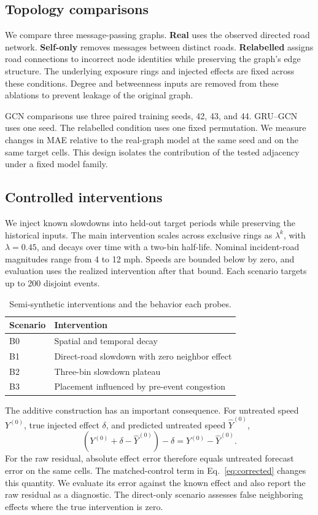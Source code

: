 \documentclass[sigconf,nonacm]{acmart}
\begin{document}
\subsection{Topology comparisons}
We compare three message-passing graphs. \textbf{Real} uses the observed directed road network. \textbf{Self-only} removes messages between distinct roads. \textbf{Relabelled} assigns road connections to incorrect node identities while preserving the graph's edge structure. The underlying exposure rings and injected effects are fixed across these conditions. Degree and betweenness inputs are removed from these ablations to prevent leakage of the original graph.

GCN comparisons use three paired training seeds, 42, 43, and 44. GRU--GCN uses one seed. The relabelled condition uses one fixed permutation. We measure changes in MAE relative to the real-graph model at the same seed and on the same target cells. This design isolates the contribution of the tested adjacency under a fixed model family.

\subsection{Controlled interventions}
We inject known slowdowns into held-out target periods while preserving the historical inputs. The main intervention scales across exclusive rings as $\lambda^k$, with $\lambda=0.45$, and decays over time with a two-bin half-life. Nominal incident-road magnitudes range from 4 to 12 mph. Speeds are bounded below by zero, and evaluation uses the realized intervention after that bound. Each scenario targets up to 200 disjoint events.

\begin{table}[t]
\centering
\caption{Semi-synthetic interventions and the behavior each probes.}
\label{tab:scenarios}
\footnotesize
\begin{tabular}{lp{}}
\toprule
Scenario & Intervention \\
\midrule
B0 & Spatial and temporal decay \\
B1 & Direct-road slowdown with zero neighbor effect \\
B2 & Three-bin slowdown plateau \\
B3 & Placement influenced by pre-event congestion \\
\bottomrule
\end{tabular}
\end{table}

The additive construction has an important consequence. For untreated speed $Y^{(0)}$, true injected effect $\delta$, and predicted untreated speed $\widehat Y^{(0)}$,
\begin{equation}
\left(Y^{(0)}+\delta-\widehat Y^{(0)}\right)-\delta
=Y^{(0)}-\widehat Y^{(0)}.
\label{eq:identity}
\end{equation}
For the raw residual, absolute effect error therefore equals untreated forecast error on the same cells. The matched-control term in Eq.~\eqref{eq:corrected} changes this quantity. We evaluate its error against the known effect and also report the raw residual as a diagnostic. The direct-only scenario assesses false neighboring effects where the true intervention is zero.
\end{document}
